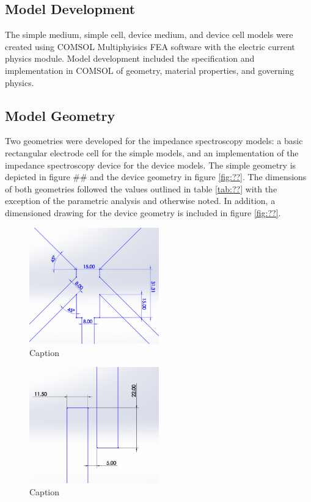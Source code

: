 \subsection{Model Development}
\par The simple medium, simple cell, device medium, and device cell models were created using COMSOL Multiphyisics FEA software with the electric current physics module. Model development included the specification and implementation in COMSOL of geometry, material properties, and governing physics.

\subsection*{Model Geometry}
\par Two geometries were developed for the impedance spectroscopy models: a basic rectangular electrode cell for the simple models, and an implementation of the impedance spectroscopy device for the device models. The simple geometry is depicted in figure ## and the device geometry in figure \ref{fig:??}. The dimensions of both geometries followed the values outlined in table \ref{tab:??} with the exception of the parametric analysis and otherwise noted. In addition, a dimensioned drawing for the device geometry is included in figure \ref{fig:??}.

\begin{figure}
    \centering
    \includegraphics[width = 0.5\textwidth]{images/channel_dimensions.png}
    \caption{Caption}
    \label{fig:my_label}
\end{figure}

\begin{figure}
    \centering
    \includegraphics[width = 0.5\textwidth]{images/electrode_dimensions.png}
    \caption{Caption}
    \label{fig:my_label}
\end{figure}


